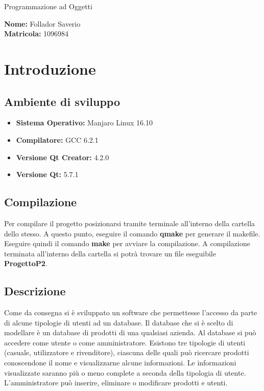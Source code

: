 \documentclass[openany, a4paper,10pt] {article}
\begin{document}
\begin{center}

\begin{Huge} Programmazione ad Oggetti \end{Huge}

\vfill

\begin{Large} \textbf{Nome:} Follador Saverio \\ \textbf{Matricola:} 1096984 \end{Large}

\end{center}

\newpage

\tableofcontents

\newpage

\section{Introduzione}

\subsection{Ambiente di sviluppo}
\begin{itemize}
	\item \textbf{Sistema Operativo:} Manjaro Linux 16.10
	\item \textbf{Compilatore:} GCC 6.2.1
	\item \textbf{Versione Qt Creator:} 4.2.0
	\item \textbf{Versione Qt:} 5.7.1
\end{itemize}

\subsection{Compilazione}
Per compilare il progetto posizionarsi tramite terminale all'interno della cartella dello stesso. A questo punto, eseguire il comando \textbf{qmake} per generare
il makefile. Eseguire quindi il comando \textbf{make} per avviare la compilazione. A compilazione terminata all'interno della cartella si potrà trovare un file 
eseguibile \textbf{ProgettoP2}.

\subsection{Descrizione}
Come da consegna si è sviluppato un software che permettesse l'accesso da parte di alcune tipologie di utenti ad un database. Il database che si è scelto di 
modellare è un database di prodotti di una qualsiasi azienda. Al database si può accedere come utente o come amministratore. Esistono tre tipologie di utenti (casuale, utilizzatore e rivenditore), ciascuna delle quali può
ricercare prodotti conoscendone il nome e visualizzarne alcune informazioni. Le informazioni visualizzate saranno più o meno complete a seconda della tipologia
di utente. L'amministratore può inserire, eliminare o modificare prodotti e utenti.
\end{document}
